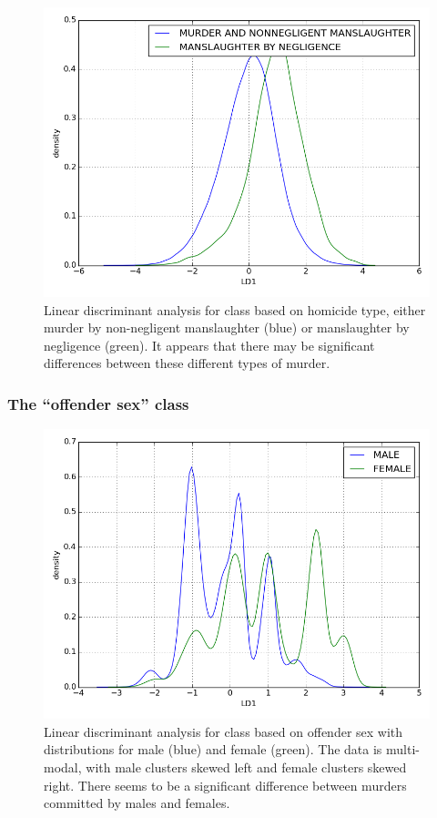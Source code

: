 \documentclass{evanarticle}
\begin{document}
\begin{figure}[H]
  \centering
    \includegraphics[width=\linewidth]{images/homicide/type.png}
  \caption{Linear discriminant analysis for class based on homicide type, either murder by non-negligent manslaughter (blue) or manslaughter by negligence (green).  It appears that there may be significant differences between these different types of murder.}
  \label{fig_type}
\end{figure}

\subsubsection{The ``offender sex'' class} \label{sec_offender_sex_class}

\begin{figure}[H]
  \centering
    \includegraphics[width=\linewidth]{images/offn_sex/offn_sex.png}
  \caption{Linear discriminant analysis for class based on offender sex with distributions for male (blue) and female (green).  The data is multi-modal, with male clusters skewed left and female clusters skewed right.  There seems to be a significant difference between murders committed by males and females.}
  \label{fig_offn_sex}
\end{figure}
\end{document}
